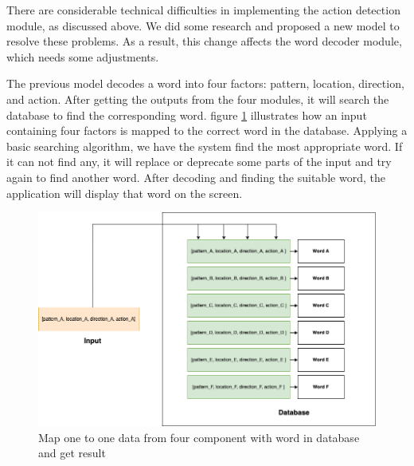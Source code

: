 











There are considerable technical difficulties in implementing the action detection module, as discussed above. We did some research and proposed a new model to resolve these problems. As a result, this change affects the word decoder module, which needs some adjustments.

The previous model decodes a word into four factors: pattern, location, direction, and action. After getting the outputs from the four modules, it will search the database to find the corresponding word. figure \ref{fig:Chap4-MapWord} illustrates how an input containing four factors is mapped to the correct word in the database. Applying a basic searching algorithm, we have the system find the most appropriate word. If it can not find any, it will replace or deprecate some parts of the input and try again to find another word. After decoding and finding the suitable word, the application will display that word on the screen.

\begin{figure}[H]
	\centering
	\includegraphics[width=\textwidth]{img/Chap4/MapWord.png}
	\caption{Map one to one data from four component with word in database and get result}
	\label{fig:Chap4-MapWord}
\end{figure}

